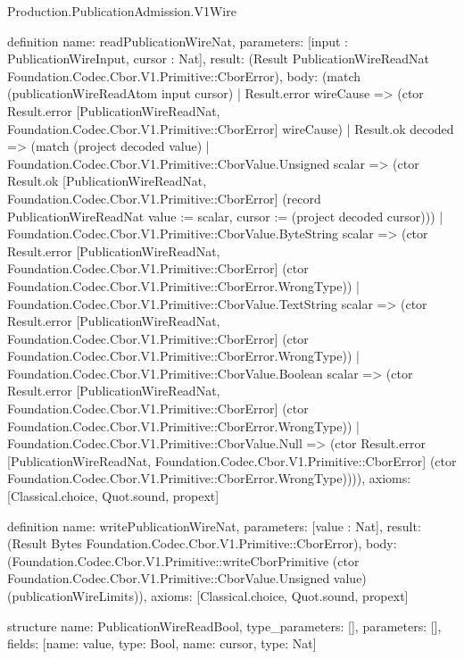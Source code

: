 \begin{lexlean}{Production.PublicationAdmission.V1Wire}
\begin{semanticmodule}
definition{
  name: readPublicationWireNat,
  parameters: [input : PublicationWireInput, cursor : Nat],
  result: (Result PublicationWireReadNat Foundation.Codec.Cbor.V1.Primitive::CborError),
  body: (match (publicationWireReadAtom input cursor)
    | Result.error wireCause => (ctor Result.error [PublicationWireReadNat, Foundation.Codec.Cbor.V1.Primitive::CborError] wireCause)
    | Result.ok decoded => (match (project decoded value)
      | Foundation.Codec.Cbor.V1.Primitive::CborValue.Unsigned scalar => (ctor Result.ok [PublicationWireReadNat, Foundation.Codec.Cbor.V1.Primitive::CborError] (record PublicationWireReadNat {value := scalar, cursor := (project decoded cursor)}))
      | Foundation.Codec.Cbor.V1.Primitive::CborValue.ByteString scalar => (ctor Result.error [PublicationWireReadNat, Foundation.Codec.Cbor.V1.Primitive::CborError] (ctor Foundation.Codec.Cbor.V1.Primitive::CborError.WrongType))
      | Foundation.Codec.Cbor.V1.Primitive::CborValue.TextString scalar => (ctor Result.error [PublicationWireReadNat, Foundation.Codec.Cbor.V1.Primitive::CborError] (ctor Foundation.Codec.Cbor.V1.Primitive::CborError.WrongType))
      | Foundation.Codec.Cbor.V1.Primitive::CborValue.Boolean scalar => (ctor Result.error [PublicationWireReadNat, Foundation.Codec.Cbor.V1.Primitive::CborError] (ctor Foundation.Codec.Cbor.V1.Primitive::CborError.WrongType))
      | Foundation.Codec.Cbor.V1.Primitive::CborValue.Null => (ctor Result.error [PublicationWireReadNat, Foundation.Codec.Cbor.V1.Primitive::CborError] (ctor Foundation.Codec.Cbor.V1.Primitive::CborError.WrongType)))),
  axioms: [Classical.choice, Quot.sound, propext]
}

definition{
  name: writePublicationWireNat,
  parameters: [value : Nat],
  result: (Result Bytes Foundation.Codec.Cbor.V1.Primitive::CborError),
  body: (Foundation.Codec.Cbor.V1.Primitive::writeCborPrimitive (ctor Foundation.Codec.Cbor.V1.Primitive::CborValue.Unsigned value) (publicationWireLimits)),
  axioms: [Classical.choice, Quot.sound, propext]
}

structure{
  name: PublicationWireReadBool,
  type_parameters: [],
  parameters: [],
  fields: [{name: value, type: Bool}, {name: cursor, type: Nat}]
}


\end{semanticmodule}
\end{lexlean}
